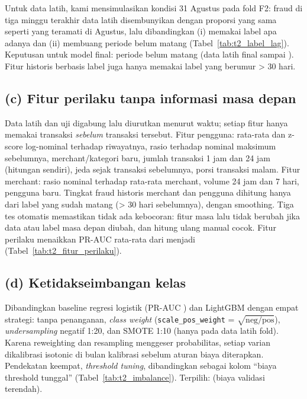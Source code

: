Untuk data latih, kami mensimulasikan kondisi 31 Agustus pada fold F2: fraud di tiga minggu terakhir data latih disembunyikan dengan proporsi
yang sama seperti yang teramati di Agustus, lalu dibandingkan (i) memakai label apa adanya dan (ii) membuang periode belum matang
(Tabel~\ref{tab:t2_label_lag}). Keputusan untuk model final: \textbf{\TduaKonfigLabel} periode belum matang (data latih final sampai \TduaBatasLatih).
Fitur historis berbasis label juga hanya memakai label yang berumur > 30 hari.



\subsection*{(c) Fitur perilaku tanpa informasi masa depan}
Data latih dan uji digabung lalu diurutkan menurut waktu; setiap fitur hanya memakai transaksi \emph{sebelum} transaksi tersebut.
Fitur pengguna: rata-rata dan z-score log-nominal terhadap riwayatnya, rasio terhadap nominal maksimum sebelumnya, merchant/kategori baru,
jumlah transaksi 1 jam dan 24 jam (hitungan sendiri), jeda sejak transaksi sebelumnya, porsi transaksi malam. Fitur merchant: rasio nominal
terhadap rata-rata merchant, volume 24 jam dan 7 hari, pengguna baru. Tingkat fraud historis merchant dan pengguna dihitung hanya dari label yang
sudah matang (> 30 hari sebelumnya), dengan smoothing. Tiga tes otomatis memastikan tidak ada kebocoran: fitur masa lalu tidak berubah jika data
atau label masa depan diubah, dan hitung ulang manual cocok. Fitur perilaku menaikkan PR-AUC rata-rata dari \TduaPRTanpaPerilaku{} menjadi
\TduaPRPerilaku{} (Tabel~\ref{tab:t2_fitur_perilaku}).



\subsection*{(d) Ketidakseimbangan kelas}
Dibandingkan baseline regresi logistik (PR-AUC \TduaPRLogreg) dan LightGBM dengan empat strategi: tanpa penanganan, \textit{class weight}
(\texttt{scale\_pos\_weight} = $\sqrt{\text{neg}/\text{pos}}$), \textit{undersampling} negatif 1:20, dan SMOTE 1:10 (hanya pada data latih fold).
Karena reweighting dan resampling menggeser probabilitas, setiap varian dikalibrasi isotonic di bulan kalibrasi sebelum aturan biaya diterapkan.
Pendekatan keempat, \textit{threshold tuning}, dibandingkan sebagai kolom ``biaya threshold tunggal'' (Tabel~\ref{tab:t2_imbalance}).
Terpilih: \textbf{\TduaKonfigImbalance} (biaya validasi terendah).

